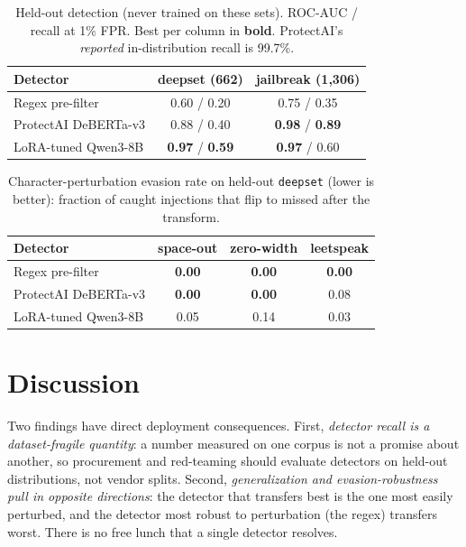 \documentclass[11pt]{article}
\newcommand{\best}[1]{\textbf{#1}}
\begin{document}
\begin{table}[t]
\centering\small
\setlength\tabcolsep{5pt}
\caption{Held-out detection (never trained on these sets). ROC-AUC / recall at 1\% FPR.
Best per column in \best{bold}. ProtectAI's \emph{reported} in-distribution recall is 99.7\%.}
\label{tab:main}
\begin{tabular}{lcc}
\toprule
Detector & deepset (662) & jailbreak (1{,}306) \\
\midrule
Regex pre-filter & 0.60 / 0.20 & 0.75 / 0.35 \\
ProtectAI DeBERTa-v3 & 0.88 / 0.40 & \best{0.98} / \best{0.89} \\
LoRA-tuned Qwen3-8B & \best{0.97} / \best{0.59} & \best{0.97} / 0.60 \\
\bottomrule
\end{tabular}
\end{table}

\begin{table}[t]
\centering\small
\setlength\tabcolsep{4pt}
\caption{Character-perturbation evasion rate on held-out \texttt{deepset} (lower is better):
fraction of caught injections that flip to missed after the transform.}
\label{tab:evasion}
\begin{tabular}{lccc}
\toprule
Detector & space-out & zero-width & leetspeak \\
\midrule
Regex pre-filter & \best{0.00} & \best{0.00} & \best{0.00} \\
ProtectAI DeBERTa-v3 & \best{0.00} & \best{0.00} & 0.08 \\
LoRA-tuned Qwen3-8B & 0.05 & 0.14 & 0.03 \\
\bottomrule
\end{tabular}
\end{table}

\section{Discussion}
Two findings have direct deployment consequences. First, \emph{detector recall is a
dataset-fragile quantity}: a number measured on one corpus is not a promise about another, so
procurement and red-teaming should evaluate detectors on held-out distributions, not vendor splits.
Second, \emph{generalization and evasion-robustness pull in opposite directions}: the detector that
transfers best is the one most easily perturbed, and the detector most robust to perturbation
(the regex) transfers worst. There is no free lunch that a single detector resolves.
\end{document}
